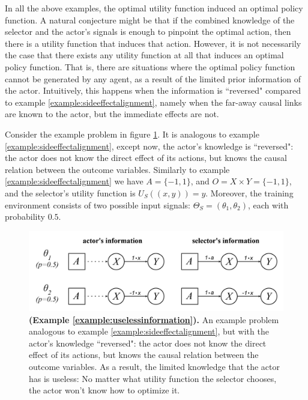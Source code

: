 \bigskip
 In all the above examples, the optimal utility function induced an optimal policy function. A natural conjecture might be that if the combined knowledge of the selector and the actor's signals is enough to pinpoint the optimal action, then there is a utility function that induces that action. However, it is not necessarily the case that there exists any utility function at all that induces an optimal policy function. That is, there are situations where the optimal policy function cannot be generated by any agent, as a result of the limited prior information of the actor. Intuitively, this happens when the information is ``reversed" compared to example \ref{example:sideeffectalignment}, namely when the far-away causal links are known to the actor, but the immediate effects are not. 
 
 \begin{example}\label{example:uselessinformation}
 	\textnormal{Consider the example problem in figure \ref{fig:uselessinformation}. It is analogous to example \ref{example:sideeffectalignment}, except now, the actor's knowledge is ``reversed": the actor does not know the direct effect of its actions, but knows the causal relation between the outcome variables. Similarly to example \ref{example:sideeffectalignment} we have $A=\{-1,1\}$, and $O=X\times Y=\{-1,1\}$, and the selector's utility function is $U_S((x,y))=y$. Moreover, the training environment consists of two possible input signals: $\Theta_S=(\theta_1,\theta_2)$, each with probability $0.5$. }
 \end{example}
 \begin{figure}[h]
 	\centering
 	\captionsetup{labelfont=bf,font=small,labelsep=space}
 	\includegraphics[width=0.7\linewidth]{"images/examples/4-uselessinformation"}
 	\caption{\rightskip=20pt\leftskip=20pt \textbf{(Example \ref{example:uselessinformation}).} An example problem analogous to example \ref{example:sideeffectalignment}, but with the actor's knowledge ``reversed": the actor does not know the direct effect of its actions, but knows the causal relation between the outcome variables. As a result, the limited knowledge that the actor has is useless: No matter what utility function the selector chooses, the actor won't know how to optimize it. }
 	\label{fig:uselessinformation}
 \end{figure}

